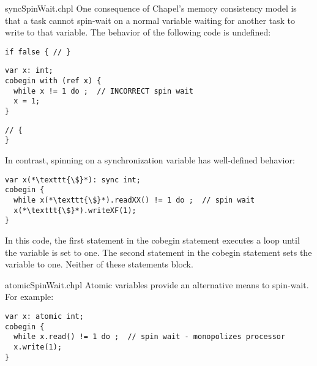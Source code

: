 \begin{chapelexample}{syncSpinWait.chpl}
One consequence of Chapel's memory consistency model is that a task cannot spin-wait on a
normal variable waiting for another task to write to that variable.  The behavior of
the following code is undefined:

\begin{chapelpre}
\begin{verbatim}
if false { // }
\end{verbatim}
\end{chapelpre}
\begin{chapel}
\begin{verbatim}
var x: int;
cobegin with (ref x) {
  while x != 1 do ;  // INCORRECT spin wait
  x = 1;
}
\end{verbatim}
\end{chapel}
\begin{chapelnoprint}
\begin{verbatim}
// {
}
\end{verbatim}
\end{chapelnoprint}
In contrast, spinning on a synchronization variable has well-defined
behavior:
\begin{chapel}
\begin{verbatim}
var x(*\texttt{\$}*): sync int;
cobegin {
  while x(*\texttt{\$}*).readXX() != 1 do ;  // spin wait
  x(*\texttt{\$}*).writeXF(1);
}
\end{verbatim}
\end{chapel}

In this code, the first statement in the cobegin statement executes a
loop until the variable is set to one.  The second statement in the
cobegin statement sets the variable to one.  Neither of these
statements block.
\end{chapelexample}

\begin{chapelexample}{atomicSpinWait.chpl}
Atomic variables provide an alternative means to spin-wait.
For example:

\begin{chapel}
\begin{verbatim}
var x: atomic int;
cobegin {
  while x.read() != 1 do ;  // spin wait - monopolizes processor
  x.write(1);
}
\end{verbatim}
\end{chapel}

\end{chapelexample}


